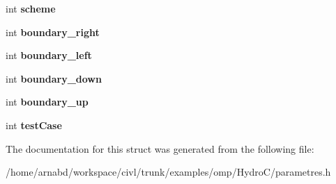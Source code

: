 \begin{DoxyCompactItemize}
\item 
\hypertarget{struct__hydroparam_a136f060e39a2c637d46a010755e82e26}{}int {\bfseries scheme}\label{struct__hydroparam_a136f060e39a2c637d46a010755e82e26}

\item 
\hypertarget{struct__hydroparam_a18ec3d241f3451dc9db71bbdac83cd98}{}int {\bfseries boundary\+\_\+right}\label{struct__hydroparam_a18ec3d241f3451dc9db71bbdac83cd98}

\item 
\hypertarget{struct__hydroparam_ac8d047c27a7cd604b10c7fbb2c60b04e}{}int {\bfseries boundary\+\_\+left}\label{struct__hydroparam_ac8d047c27a7cd604b10c7fbb2c60b04e}

\item 
\hypertarget{struct__hydroparam_af454992d79ca67f718b2963c81b3310f}{}int {\bfseries boundary\+\_\+down}\label{struct__hydroparam_af454992d79ca67f718b2963c81b3310f}

\item 
\hypertarget{struct__hydroparam_aa784743d73f14f4417e49b7132d1c6e8}{}int {\bfseries boundary\+\_\+up}\label{struct__hydroparam_aa784743d73f14f4417e49b7132d1c6e8}

\item 
\hypertarget{struct__hydroparam_ab5b0f24a0fc45027ecc9c90233b50d05}{}int {\bfseries test\+Case}\label{struct__hydroparam_ab5b0f24a0fc45027ecc9c90233b50d05}

\end{DoxyCompactItemize}


The documentation for this struct was generated from the following file\+:\begin{DoxyCompactItemize}
\item 
/home/arnabd/workspace/civl/trunk/examples/omp/\+Hydro\+C/parametres.\+h\end{DoxyCompactItemize}
